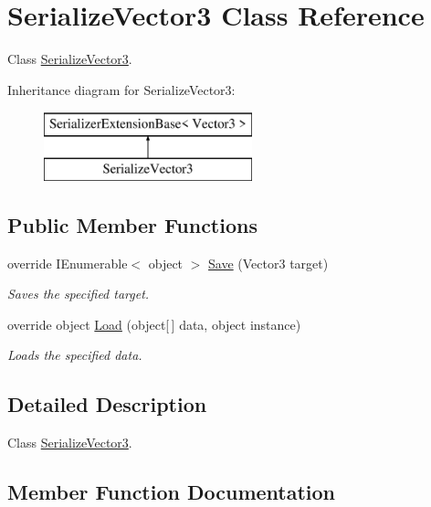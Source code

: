 \hypertarget{class_serialize_vector3}{}\section{Serialize\+Vector3 Class Reference}
\label{class_serialize_vector3}


Class \hyperlink{class_serialize_vector3}{Serialize\+Vector3}.  


Inheritance diagram for Serialize\+Vector3\+:\begin{figure}[H]
\begin{center}
\leavevmode
\includegraphics[height=2.000000cm]{class_serialize_vector3}
\end{center}
\end{figure}
\subsection*{Public Member Functions}
\begin{DoxyCompactItemize}
\item 
override I\+Enumerable$<$ object $>$ \hyperlink{class_serialize_vector3_a005d95ae45a7c705f995c23c95efecdc}{Save} (Vector3 target)
\begin{DoxyCompactList}\small\item\em Saves the specified target. \end{DoxyCompactList}\item 
override object \hyperlink{class_serialize_vector3_afe202cbbd524fb146e0a4ff17d6b0e62}{Load} (object\mbox{[}$\,$\mbox{]} data, object instance)
\begin{DoxyCompactList}\small\item\em Loads the specified data. \end{DoxyCompactList}\end{DoxyCompactItemize}


\subsection{Detailed Description}
Class \hyperlink{class_serialize_vector3}{Serialize\+Vector3}. 



\subsection{Member Function Documentation}
\mbox{\label{class_serialize_vector3_afe202cbbd524fb146e0a4ff17d6b0e62}} 

